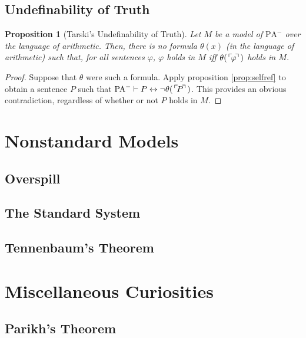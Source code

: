 \documentclass{article}
\newtheorem{prop}[theorem]{Proposition}
\theoremstyle{nonumberplain}
\newtheorem{proof}{Proof}
\newcommand{\PA}{\mathrm{PA}}
\newcommand{\WPA}{\PA^-}
\newcommand{\gn}[1]{\setbox0=\hbox{$\mathclap{\phantom{t}}#1$} \dimen0=\ht0 \advance\dimen0 by -1.25ex \,\raise\dimen0\hbox{$\ulcorner$} \! \box0 \! \raise\dimen0\hbox{$\urcorner$}\,}
\begin{document}
\subsection{Undefinability of Truth}\label{sec:tarski}

\begin{prop}[Tarski's Undefinability of Truth]
Let $M$ be a model of $\WPA$ over the language of arithmetic. Then, there is no formula $\theta(x)$ (in the language of arithmetic) such that, for all sentences $\varphi$, $\varphi$ holds in $M$ iff $\theta(\gn\varphi)$ holds in $M$.
\end{prop}

\begin{proof}
Suppose that $\theta$ were such a formula. Apply proposition \ref{prop:selfref} to obtain a sentence $P$ such that $\WPA \vdash P \leftrightarrow \neg\theta(\gn P)$. This provides an obvious contradiction, regardless of whether or not $P$ holds in $M$.
\end{proof}

\section{Nonstandard Models}\label{sec:nonstd}

\subsection{Overspill}

\subsection{The Standard System}

\subsection{Tennenbaum's Theorem}

\section{Miscellaneous Curiosities}

\subsection{Parikh's Theorem}

%
%
\end{document}
